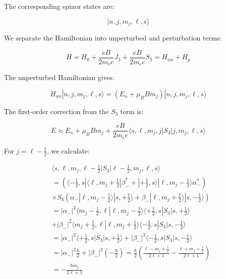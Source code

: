 \documentclass[italian]{HKNdocument}
\begin{document}
The corresponding spinor states are:

\begin{equation}
|n, j, m_j, \ell, s\rangle
\end{equation}

We separate the Hamiltonian into unperturbed and perturbation terms:

\begin{equation}
H=H_0+\frac{eB}{2m_e c}J_3+\frac{eB}{2m_e c}S_3=H_{un}+H_p
\end{equation}

The unperturbed Hamiltonian gives:

\begin{equation}
H_{un}|n, j, m_j, \ell, s\rangle=(E_n+\mu_B Bm_j)|n, j, m_j, \ell, s\rangle
\end{equation}

The first-order correction from the $S_3$ term is:

\begin{equation}
E \approx E_n+\mu_B Bm_j+\frac{eB}{2m_e c}\langle s,\ell,m_j,j|S_3|j,m_j,\ell,s\rangle
\end{equation}

For $j=\ell-\frac{1}{2}$, we calculate:

\begin{align}
&\langle s,\ell,m_j,\ell-\frac{1}{2}|S_3|\ell-\frac{1}{2},m_j,\ell,s\rangle\\
&=(\langle-\frac{1}{2},s|\langle\ell,m_j+\frac{1}{2}|\beta_-^*+|+\frac{1}{2},s\rangle|\ell,m_j-\frac{1}{2}\rangle\alpha_-^*)\\
&\times S_3(\alpha_-|\ell,m_j-\frac{1}{2}\rangle|s,+\frac{1}{2}\rangle+\beta_-|\ell,m_j+\frac{1}{2}\rangle|s,-\frac{1}{2}\rangle)\\
&=|\alpha_-|^2\langle m_j-\frac{1}{2},\ell|\ell,m_j-\frac{1}{2}\rangle\langle+\frac{1}{2},s|S_3|s,+\frac{1}{2}\rangle\\
&+|\beta_-|^2\langle m_j+\frac{1}{2},\ell|\ell,m_j+\frac{1}{2}\rangle\langle-\frac{1}{2},s|S_3|s,-\frac{1}{2}\rangle \\
&=|\alpha_-|^2\langle+\frac{1}{2},s|S_3|s,+\frac{1}{2}\rangle+|\beta_-|^2\langle-\frac{1}{2},s|S_3|s,-\frac{1}{2}\rangle\\
&=|\alpha_-|^2\frac{\hbar}{2}+|\beta_-|^2(-\frac{\hbar}{2})=\frac{\hbar}{2}\left(\frac{\ell-m_j+\frac{1}{2}}{2\ell+1}-\frac{\ell+m_j+\frac{1}{2}}{2\ell+1}\right)\\
&=-\frac{\hbar m_j}{2\ell+1}
\end{align}
\end{document}
